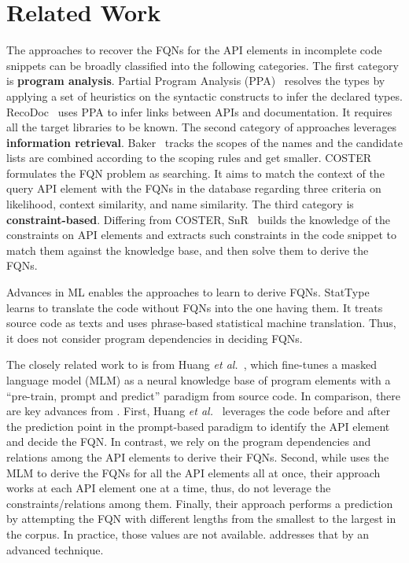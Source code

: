 \section{Related Work}
\label{sec:related}

The approaches to recover the FQNs for the API elements in incomplete
code snippets can be broadly classified into the following categories.
The first category is {\bf program analysis}. Partial Program Analysis
(PPA)~\cite{dagenais-oopsla08} resolves the types by applying a set of
heuristics on the syntactic constructs to infer the declared
types. RecoDoc~\cite{dagenais-icse12} uses PPA to infer links between
APIs and documentation. It requires all the target libraries to be
known. The second category of approaches leverages {\bf
  information retrieval}. Baker~\cite{liveapi14} tracks the scopes of
the names and the candidate lists are combined according to the
scoping rules and get smaller. COSTER~\cite{coster-ase19} formulates
the FQN problem as searching. It aims to match the context of the
query API element with the FQNs in the database regarding three
criteria on likelihood, context similarity, and name similarity.  The
third category is {\bf constraint-based}. Differing from COSTER,
SnR~\cite{snr-icse22} builds the knowledge of the constraints on API
elements and extracts such constraints in the code snippet to match
them against the knowledge base, and then solve them to derive the
FQNs.

Advances in ML enables the approaches to learn to
derive FQNs. StatType~\cite{icse18} learns to translate the code
without FQNs into the one having them. It treats source code as texts
and uses phrase-based statistical machine translation. Thus, it does
not consider program dependencies in deciding FQNs.

The closely related work to {\tool} is from Huang {\em et
  al.}~\cite{prompt-ase22}, which fine-tunes a masked language model
(MLM) as a neural knowledge base of program elements with a
``pre-train, prompt and predict'' paradigm from source code. In
comparison, there are key advances from {\tool}. First, Huang {\em et
  al.}~\cite{prompt-ase22} leverages the code before and after the
prediction point in the prompt-based paradigm to identify the API
element and decide the FQN. In contrast, we rely on the program
dependencies and relations among the API elements to derive their
FQNs. Second, while {\tool} uses the MLM to derive the FQNs for all
the API elements all at once, their approach works at each API element
one at a time, thus, do not leverage the constraints/relations among
them. Finally, their approach performs a prediction by attempting the
FQN with different lengths from the smallest to the largest in the
corpus. In practice, those values are not available. {\tool}
addresses that by an advanced technique.


